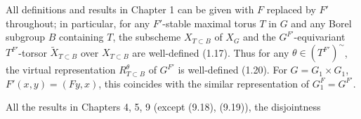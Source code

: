 \documentclass[9pt,twoside]{extarticle}
\begin{document}
{All definitions and results in Chapter 1 can be given with \(F\) replaced by \(F'\) throughout; in particular, for any \(F'\)-stable maximal torus \(T\) in \(G\) and any Borel subgroup \(B\) containing \(T\), the subscheme \(X_{T\subset B}\) of \(X_G\) and the \(G^{F'}\)-equivariant \(T^{F'}\)-torsor \(\widetilde X_{T\subset B}\) over \(X_{T\subset B}\) are well-defined (1.17). Thus for any \(\theta\in(T^{F'})^{\sim}\), the virtual representation \(R_{T\subset B}^\theta\) of \(G^{F'}\) is well-defined (1.20). For \(G=G_1\times G_1\), \(F'(x,y)=(Fy,x)\), this coincides with the similar representation of \(G_1^F=G^{F'}\).\par

All the results in Chapters 4, 5, 9 (except (9.18), (9.19)), the disjointness\par
}
\end{document}
